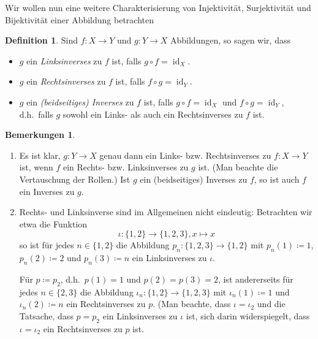 \documentclass[a4paper,10pt]{article}
\theoremstyle{definition}
\newtheorem*{defi}{Definition}
\newtheorem*{bems}{Bemerkungen}
\DeclareMathOperator{\id}{id}
\begin{document}
Wir wollen nun eine weitere Charakterisierung von Injektivität, Surjektivität und Bijektivität einer Abbildung betrachten

\begin{defi}
 Sind $f \colon X \to Y$ und $g \colon Y \to X$ Abbildungen, so sagen wir, dass
 \begin{itemize}
  \item
   $g$ ein \emph{Linksinverses} zu $f$ ist, falls $g \circ f = \id_X$.
  \item
   $g$ ein \emph{Rechtsinverses} zu $f$ ist, falls $f \circ g = \id_Y$.
  \item
   $g$ ein \emph{(beidseitiges) Inverses} zu $f$ ist, falls $g \circ f = \id_X$ und $f \circ g = \id_Y$, d.h.\ falls $g$ sowohl ein Links- als auch ein Rechtsinverses zu $f$ ist.
 \end{itemize}
\end{defi}

\begin{bems}
 \begin{enumerate}[label=\alph*),leftmargin=*]
  \item
   Es ist klar, $g \colon Y \to X$ genau dann ein Links- bzw. Rechtsinverses zu $f \colon X \to Y$ ist, wenn $f$ ein Rechts- bzw. Linksinverses zu $g$ ist. (Man beachte die Vertauschung der Rollen.) Ist $g$ ein (beidseitiges) Inverses zu $f$, so ist auch $f$ ein Inverses zu $g$.
  \item
   Rechts- und Linksinverse sind im Allgemeinen nicht eindeutig: Betrachten wir etwa die Funktion
   \[
    \iota \colon \{1, 2\} \to \{1, 2, 3\}, x \mapsto x
   \]
   so ist für jedes $n \in \{1, 2\}$ die Abbildung $p_n \colon \{1, 2, 3\} \to \{1, 2\}$ mit $p_n(1) \coloneqq 1$, $p_n(2) \coloneqq 2$ und $p_n(3) \coloneqq n$ ein Linksinverses zu $\iota$.
   
   Für $p \coloneqq p_2$, d.h.\ $p(1) = 1$ und $p(2) = p(3) = 2$, ist andererseits für jedes $n \in \{2, 3\}$ die Abbildung $\iota_n \colon \{1, 2\} \to \{1, 2, 3\}$ mit $\iota_n(1) \coloneqq 1$ und $\iota_n(2) \coloneqq n$ ein Rechtsinverses zu $p$. (Man beachte, dass $\iota = \iota_2$ und die Tatsache, dass $p = p_2$ ein Linksinverses zu $\iota$ ist, sich darin widerspiegelt, dass $\iota = \iota_2$ ein Rechtsinverses zu $p$ ist.
 \end{enumerate}
\end{bems}
\end{document}
